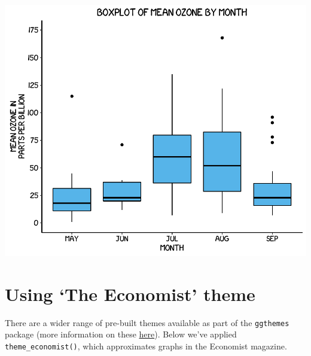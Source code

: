 \documentclass[]{article}
\begin{document}
\begin{center}\includegraphics{10_Boxplots_pdf/box_11-1} \end{center}

\section{\texorpdfstring{Using `The Economist'
theme}{Using The Economist theme}}\label{using-the-economist-theme}

There are a wider range of pre-built themes available as part of the
\texttt{ggthemes} package (more information on these
\href{https://cran.r-project.org/web/packages/ggthemes/vignettes/ggthemes.html}{here}).
Below we've applied \texttt{theme\_economist()}, which approximates
graphs in the Economist magazine.
\end{document}
